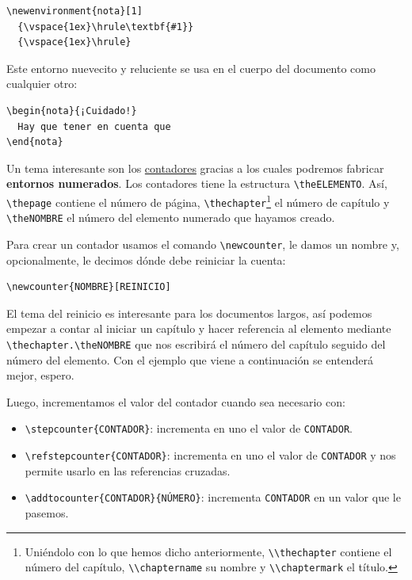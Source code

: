 \begin{lstlisting}[language={[latex]tex}]
\newenvironment{nota}[1]
  {\vspace{1ex}\hrule\textbf{#1}}
  {\vspace{1ex}\hrule}
\end{lstlisting}

Este entorno nuevecito y reluciente se usa en el cuerpo del documento
como cualquier otro:

\begin{lstlisting}[language={[latex]tex}]
\begin{nota}{¡Cuidado!}
  Hay que tener en cuenta que
\end{nota}
\end{lstlisting}

Un tema interesante son los
\href{https://www.sharelatex.com/learn/Counters}{contadores} gracias a
los cuales podremos fabricar \textbf{entornos numerados}. Los contadores
tiene la estructura \lstinline!\theELEMENTO!. Así, \lstinline!\thepage!
contiene el número de página, \lstinline!\thechapter!\footnote{Uniéndolo
  con lo que hemos dicho anteriormente, \lstinline!\\thechapter! contiene
  el número del capítulo, \lstinline!\\chaptername! su nombre y
  \lstinline!\\chaptermark! el título.} el número de capítulo y
\lstinline!\theNOMBRE! el número del elemento numerado que hayamos
creado.

Para crear un contador usamos el comando \lstinline!\newcounter!, le
damos un nombre y, opcionalmente, le decimos dónde debe reiniciar la
cuenta:

\begin{lstlisting}[language={[latex]tex}]
\newcounter{NOMBRE}[REINICIO]
\end{lstlisting}

El tema del reinicio es interesante para los documentos largos, así
podemos empezar a contar al iniciar un capítulo y hacer referencia al
elemento mediante \lstinline!\thechapter.\theNOMBRE! que nos escribirá
el número del capítulo seguido del número del elemento. Con el ejemplo
que viene a continuación se entenderá mejor, espero.

Luego, incrementamos el valor del contador cuando sea necesario con:

\begin{itemize}
\item
  \lstinline!\stepcounter{CONTADOR}!: incrementa en uno el valor de
  \lstinline!CONTADOR!.
\item
  \lstinline!\refstepcounter{CONTADOR}!: incrementa en uno el valor de
  \lstinline!CONTADOR! y nos permite usarlo en las referencias cruzadas.
\item
  \lstinline!\addtocounter{CONTADOR}{NÚMERO}!: incrementa
  \lstinline!CONTADOR! en un valor que le pasemos.
\end{itemize}

